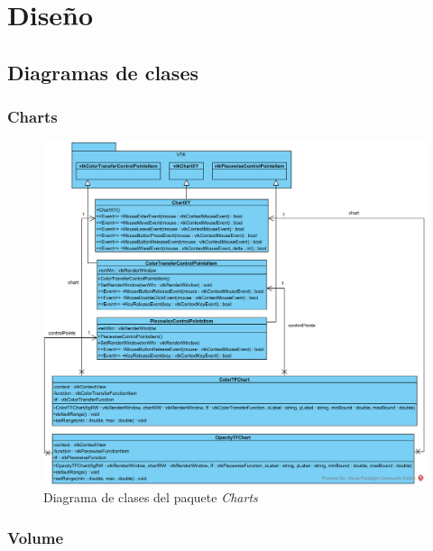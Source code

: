 \chapter{Diseño}

\section{Diagramas de clases}

\subsection{Charts}

\begin{figure}[H]
	\centering
	\includegraphics[width=12.5cm]{imagenes/diagramas/clases/Charts}
	\caption{Diagrama de clases del paquete \textit{Charts}}
	\label{fig:diagrama_clases_charts}
\end{figure}

\subsection{Volume}

